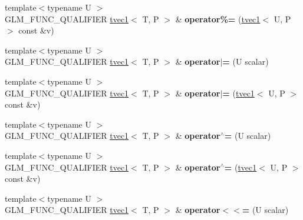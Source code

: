 \begin{DoxyCompactItemize}
\item 
\mbox{\label{structglm_1_1tvec1_aa8eca5faec8c0bef17a99524d60bf89d}} 
{\footnotesize template$<$typename U $>$ }\\G\+L\+M\+\_\+\+F\+U\+N\+C\+\_\+\+Q\+U\+A\+L\+I\+F\+I\+ER \hyperlink{structglm_1_1tvec1}{tvec1}$<$ T, P $>$ \& {\bfseries operator\%=} (\hyperlink{structglm_1_1tvec1}{tvec1}$<$ U, P $>$ const \&v)
\item 
\mbox{\label{structglm_1_1tvec1_a6de69a3e4ce3e247dff53f4323fedd9d}} 
{\footnotesize template$<$typename U $>$ }\\G\+L\+M\+\_\+\+F\+U\+N\+C\+\_\+\+Q\+U\+A\+L\+I\+F\+I\+ER \hyperlink{structglm_1_1tvec1}{tvec1}$<$ T, P $>$ \& {\bfseries operator$\vert$=} (U scalar)
\item 
\mbox{\label{structglm_1_1tvec1_ad748418051a8d9b414a0fddbbc02d5b6}} 
{\footnotesize template$<$typename U $>$ }\\G\+L\+M\+\_\+\+F\+U\+N\+C\+\_\+\+Q\+U\+A\+L\+I\+F\+I\+ER \hyperlink{structglm_1_1tvec1}{tvec1}$<$ T, P $>$ \& {\bfseries operator$\vert$=} (\hyperlink{structglm_1_1tvec1}{tvec1}$<$ U, P $>$ const \&v)
\item 
\mbox{\label{structglm_1_1tvec1_a27fa0b38bd0bb2e76671a398c26eebc2}} 
{\footnotesize template$<$typename U $>$ }\\G\+L\+M\+\_\+\+F\+U\+N\+C\+\_\+\+Q\+U\+A\+L\+I\+F\+I\+ER \hyperlink{structglm_1_1tvec1}{tvec1}$<$ T, P $>$ \& {\bfseries operator$^\wedge$=} (U scalar)
\item 
\mbox{\label{structglm_1_1tvec1_ac0eea05981ed38c5f1eca0db90d4d768}} 
{\footnotesize template$<$typename U $>$ }\\G\+L\+M\+\_\+\+F\+U\+N\+C\+\_\+\+Q\+U\+A\+L\+I\+F\+I\+ER \hyperlink{structglm_1_1tvec1}{tvec1}$<$ T, P $>$ \& {\bfseries operator$^\wedge$=} (\hyperlink{structglm_1_1tvec1}{tvec1}$<$ U, P $>$ const \&v)
\item 
\mbox{\label{structglm_1_1tvec1_aa0276c910bb019c99e01e4bedcfd40be}} 
{\footnotesize template$<$typename U $>$ }\\G\+L\+M\+\_\+\+F\+U\+N\+C\+\_\+\+Q\+U\+A\+L\+I\+F\+I\+ER \hyperlink{structglm_1_1tvec1}{tvec1}$<$ T, P $>$ \& {\bfseries operator$<$$<$=} (U scalar)

\end{DoxyCompactItemize}

